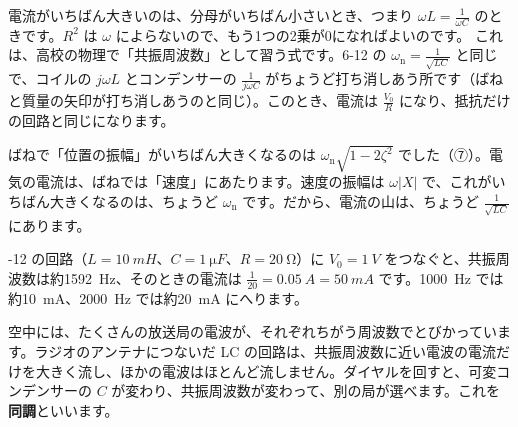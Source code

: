 電流がいちばん大きいのは、分母がいちばん小さいとき、つまり $\omega L=\frac{1}{\omega C}$ のときです。$R^2$ は $\omega$ によらないので、もう1つの2乗が0になればよいのです。
これは、高校の物理で「共振周波数」として習う式です。6-12 の $\omega_{\mathrm n}=\frac{1}{\sqrt{LC}}$ と同じで、コイルの $j\omega L$ とコンデンサーの $\frac{1}{j\omega C}$ がちょうど打ち消しあう所です（ばねと質量の矢印が打ち消しあうのと同じ）。このとき、電流は $\frac{V_0}{R}$ になり、抵抗だけの回路と同じになります。

\begin{seikaku}
ばねで「位置の振幅」がいちばん大きくなるのは $\omega_{\mathrm n}\sqrt{1-2\zeta^2}$ でした（⑦）。電気の電流は、ばねでは「速度」にあたります。速度の振幅は $\omega\lvert X\rvert$ で、これがいちばん大きくなるのは、ちょうど $\omega_{\mathrm n}$ です。だから、電流の山は、ちょうど $\frac{1}{\sqrt{LC}}$ にあります。
\end{seikaku}

-12 の回路（$L=\qty{10}{mH}$、$C=\qty{1}{\micro F}$、$R=\qty{20}{\ohm}$）に $V_0=\qty{1}{V}$ をつなぐと、共振周波数は約\qty{1592}{Hz}、そのときの電流は $\frac{1}{20}=\qty{0.05}{A}=\qty{50}{mA}$ です。\qty{1000}{Hz} では約\qty{10}{mA}、\qty{2000}{Hz} では約\qty{20}{mA} にへります。
\begin{bkfigure}
\end{bkfigure}

空中には、たくさんの放送局の電波が、それぞれちがう周波数でとびかっています。ラジオのアンテナにつないだ LC の回路は、共振周波数に近い電波の電流だけを大きく流し、ほかの電波はほとんど流しません。ダイヤルを回すと、可変コンデンサーの $C$ が変わり、共振周波数が変わって、別の局が選べます。これを\textbf{同調}といいます。

